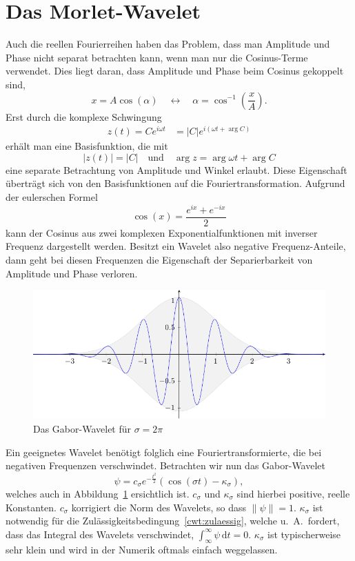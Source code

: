 \section{Das Morlet-Wavelet}
Auch die reellen Fourierreihen haben das Problem, dass man Amplitude und Phase nicht separat betrachten kann, wenn man nur die Cosinus-Terme verwendet.
Dies liegt daran, dass Amplitude und Phase beim Cosinus gekoppelt sind,
\[
x = A\cos(\alpha) \quad\leftrightarrow\quad \alpha = \cos^{-1}\left(\frac{x}{A}\right).
\]
Erst durch die komplexe Schwingung 
\begin{align*}
	z(t) = Ce^{i\omega t} &= |C|e^{i\left(\omega t + \arg C\right)}
\end{align*}
erhält man eine Basisfunktion, die mit
\[
	|z(t)| = |C| \quad \text{und}\quad
	\arg z = \arg \omega t + \arg C
\]
eine separate Betrachtung von Amplitude und Winkel erlaubt.
Diese Eigenschaft überträgt sich von den Basisfunktionen auf die Fouriertransformation.
Aufgrund der eulerschen Formel
\begin{equation}
	\cos(x) = \frac{e^{ix} + e^{-ix}}{2}\label{complex:euler}
\end{equation}
kann der Cosinus aus zwei komplexen Exponentialfunktionen mit inverser Frequenz dargestellt werden.
Besitzt ein Wavelet also negative Frequenz-Anteile, dann geht bei diesen Frequenzen die Eigenschaft der Separierbarkeit von Amplitude und Phase verloren.

\begin{figure}
	\centering
	\includegraphics{papers/complex/images/gabor.pdf}
	\caption{Das Gabor-Wavelet für $\sigma = 2\pi$ \label{complex:gabor}}
\end{figure}

Ein geeignetes Wavelet benötigt folglich eine Fouriertransformierte, die bei negativen Frequenzen verschwindet.
Betrachten wir nun das Gabor-Wavelet
\[
	\psi = c_\sigma e^{-\frac{t^2}{2}}\left(\cos\left(\sigma t\right) - \kappa_\sigma\right),
\]
welches auch in Abbildung~\ref{complex:gabor} ersichtlich ist.
$c_\sigma$ und $\kappa_\sigma$ sind hierbei positive, reelle Konstanten.
$c_\sigma$ korrigiert die Norm des Wavelets, so dass $\|\psi\| = 1$.
$\kappa_\sigma$ ist notwendig für die Zulässigkeitsbedingung~\eqref{cwt:zulaessig}, welche u.~A.~fordert, dass das Integral des Wavelets verschwindet,  $\int_{\infty}^{\infty}\psi\,\mathrm{d}t = 0$.
$\kappa_\sigma$ ist typischerweise sehr klein und wird in der Numerik oftmals einfach weggelassen.

